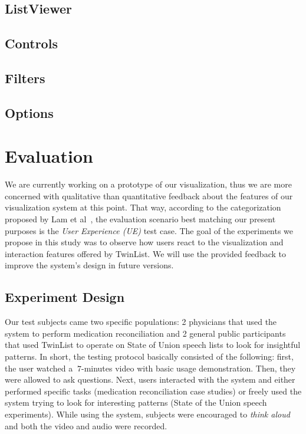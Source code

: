 \documentclass{chi2009}
\begin{document}
\subsection{ListViewer}

\subsection{Controls}

\subsection{Filters}

\subsection{Options}

\section{Evaluation}

We are currently working on a prototype of our visualization, thus we are more concerned with qualitative than quantitative feedback about the features of our visualization system at this point. That way, according to the categorization proposed by Lam et al~\cite{lam-bertini-isenberg-plaisant-carpendale-2011}, the evaluation scenario best matching our present purposes is the \textit{User Experience (UE)} test case. The goal of the experiments we propose in this study was to observe how users react to the visualization and interaction features offered by TwinList. We will use the provided feedback to improve the system's design in future versions. 

\subsection{Experiment Design}

Our test subjects came two specific populations: 2 physicians that used the system to perform medication reconciliation and 2 general public participants that used TwinList to operate on State of Union speech lists to look for insightful patterns. In short, the testing protocol basically consisted of the following: first, the user watched a $~7$-minutes video with basic usage demonstration.  Then, they were allowed to ask questions. Next, users interacted with the system and either performed specific tasks (medication reconciliation case studies) or freely used the system trying to look for interesting patterns (State of the Union speech experiments). While using the system, subjects were encouraged to \textit{think aloud} and both the video and audio were recorded. 
\end{document}
